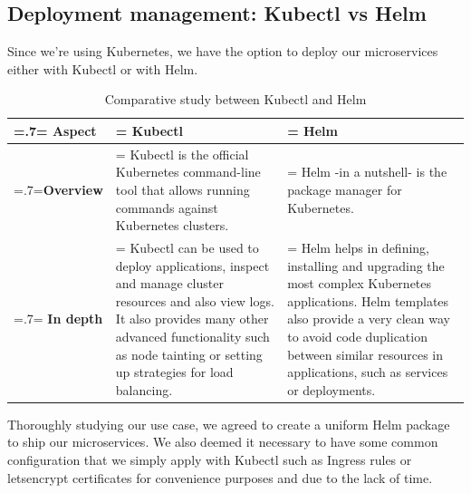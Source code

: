 \subsection{Deployment management: Kubectl vs Helm}
Since we're using Kubernetes, we have the option to deploy our microservices either with Kubectl or with Helm.
\begin{table}[H]
    \renewcommand{\arraystretch}{1.5}%
    \caption{Comparative study between Kubectl and Helm}
    \centering
    \medskip
    \begin{tabularx}{1\textwidth} {
            | >{\hsize=.7\hsize\linewidth=\hsize\centering\arraybackslash}X
            | >{\hsize=1.15\hsize\linewidth=\hsize\justifying\arraybackslash}X
            | >{\hsize=1.15\hsize\linewidth=\hsize\justifying\arraybackslash}X |}
        \hline
        \rowcolor{primary} \textbf {Aspect} & \textbf{Kubectl}                                                                                                                                                                                                                     & \textbf{Helm}                                                                                                                                                                                                                                           \\
        \hline
        \textbf {Overview}                  & \noindent Kubectl is the official Kubernetes command-line tool that allows running commands against Kubernetes clusters.                                                                                                             & \noindent Helm -in a nutshell- is the package manager for Kubernetes.                                                                                                                                                                                   \\
        \hline
        \textbf {In depth}                  & \noindent Kubectl can be used to deploy applications, inspect and manage cluster resources and also view logs. It also provides many other advanced functionality such as node tainting or setting up strategies for load balancing. & \noindent Helm helps in defining, installing and upgrading the most complex Kubernetes applications. Helm templates also provide a very clean way to avoid code duplication between similar resources in applications, such as services or deployments. \\
        \hline
    \end{tabularx}
\end{table}
Thoroughly studying our use case, we agreed to create a uniform Helm package to ship our microservices.
We also deemed it necessary to have some common configuration that we simply apply with Kubectl such as Ingress rules or letsencrypt certificates for convenience purposes and due to the lack of time.

